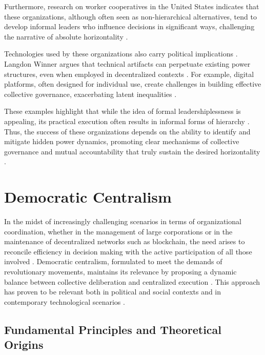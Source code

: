 Furthermore, research on worker cooperatives in the United States indicates that
these organizations, although often seen as non-hierarchical alternatives, tend
to develop informal leaders who influence decisions in significant ways,
challenging the narrative of absolute horizontality
\cite{WorkerCooperativesandRevolution}.

Technologies used by these organizations also carry political implications
\cite{DoArtifactsHavePolitics, Democraciaeoscodigosinvisiveis}. Langdon Winner
argues that technical artifacts can perpetuate existing power structures, even
when employed in decentralized contexts \cite{DoArtifactsHavePolitics}. For
example, digital platforms, often designed for individual use, create challenges
in building effective collective governance, exacerbating latent inequalities
\cite{DoArtifactsHavePolitics, BigTech}.

These examples highlight that while the idea of formal leadershiplessness is
appealing, its practical execution often results in informal forms of hierarchy
\cite{EverydayRevolutions, SocialMediaTeamsAsDigitalVanguards}. Thus, the
success of these organizations depends on the ability to identify and mitigate
hidden power dynamics, promoting clear mechanisms of collective governance and
mutual accountability that truly sustain the desired horizontality
\cite{Colbac}.

\section{Democratic Centralism}
\label{sec:democratic_centralism}

In the midst of increasingly challenging scenarios in terms of organizational
coordination, whether in the management of large corporations or in the
maintenance of decentralized networks such as blockchain, the need arises to
reconcile efficiency in decision making with the active participation of all
those involved \cite{DoArtifactsHavePolitics}. Democratic centralism, formulated
to meet the demands of revolutionary movements, maintains its relevance by
proposing a dynamic balance between collective deliberation and centralized
execution \cite{EstatutosDoPCP}. This approach has proven to be relevant both in
political and social contexts and in contemporary technological scenarios
\cite{Colbac}.

\subsection{Fundamental Principles and Theoretical Origins}
\label{subsec:fundamental_principles_origins}

